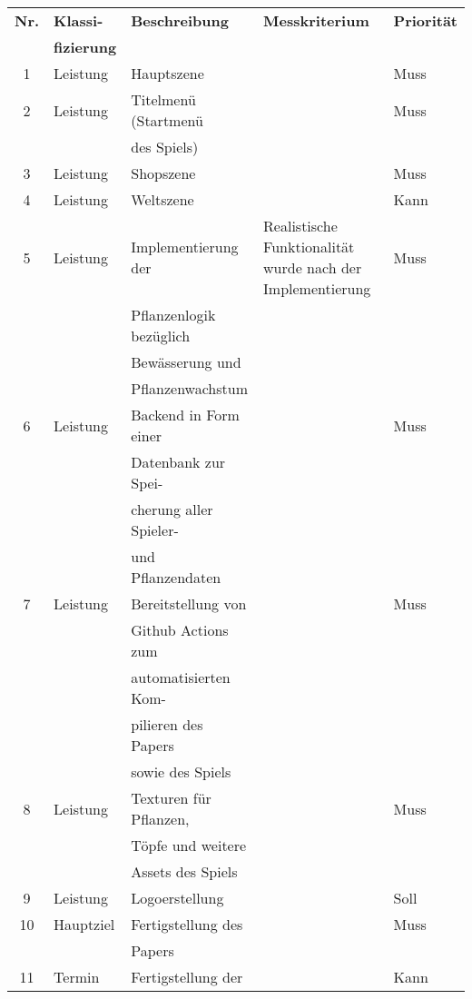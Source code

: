 \begin{table}[H]
    \begin{tabular}{|c|l|l|l|l|}
        \hline
        \textbf{Nr.} & \textbf{Klassi-} & \textbf{Beschreibung} & \textbf{Messkriterium} & \textbf{Priorität}\\ 
        & \textbf{fizierung} &&&\\[0.5ex] 
        \hline \hline
        1 & Leistung & Hauptszene && Muss\\
        \hline
        2 & Leistung & Titelmenü (Startmenü && Muss\\
        && des Spiels) && \\
        \hline
        3 & Leistung &Shopszene&& Muss\\
        \hline
        4 & Leistung &Weltszene&& Kann\\
        \hline
        5 & Leistung & Implementierung der & Realistische Funktionalität wurde nach der Implementierung& Muss\\
        && Pflanzenlogik bezüglich&&\\
        && Bewässerung und &&\\
        && Pflanzenwachstum &&\\
        \hline
        6 & Leistung & Backend in Form einer && Muss\\ 
        && Datenbank zur Spei- &&\\
        && cherung aller Spieler- &&\\
        && und Pflanzendaten &&\\
        \hline
        7 & Leistung & Bereitstellung von && Muss\\
        && Github Actions zum &&\\
        && automatisierten Kom- &&\\ 
        && pilieren des Papers &&\\
        && sowie des Spiels &&\\
        \hline
        8 & Leistung & Texturen für Pflanzen, && Muss\\ 
        && Töpfe und weitere &&\\
        && Assets des Spiels &&\\
        \hline
        9 & Leistung & Logoerstellung && Soll\\ 
        \hline
        10 & Hauptziel & Fertigstellung des && Muss\\ 
        && Papers &&\\
        \hline
        11 & Termin & Fertigstellung der && Kann\\ 

\end{tabular}
\end{table}
